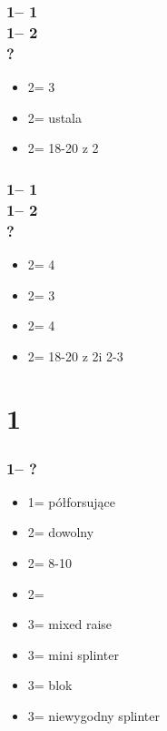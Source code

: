 \documentclass[12pt, a4paper]{report}
\begin{document}
{{{            \subsubsection*{1\diams -- 1\hearts \\
                            1\nt -- 2\clubs\\
                            ?}
            \begin{itemize}
                \item 2\diams = 3\hearts
                \item 2\hearts = ustala
                \item 2\nt = 18-20 \bal z 2\hearts
            \end{itemize}

            \subsubsection*{1\diams -- 1\spades \\
                            1\nt -- 2\clubs\\
                            ?}
            \begin{itemize}
                \item 2\diams = 4\hearts
                \item 2\hearts = 3\spades
                \item 2\spades = 4\spades
                \item 2\nt = 18-20 \bal z 2\spades i 2-3\hearts
            \end{itemize}
        }

        \section*{\colorbox{blue!30}{1\major}}
         { 
            \subsubsection*{1\major -- ?}
            \begin{itemize}
                \item 1\nt = półforsujące
                \item 2\clubs = dowolny \gf
                \item 2\major = 8-10
                \item 2\nt = \invp
                \item 3\clubs = mixed raise
                \item 3\diams = mini splinter
                \item 3\major = blok
                \item 3\nt = niewygodny splinter
            \end{itemize}
            
}}}
\end{document}

